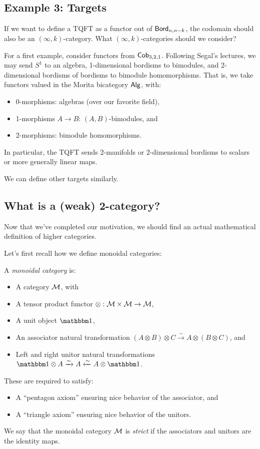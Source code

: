 \subsection{Example 3: Targets}

If we want to define a TQFT as a functor out of $\mathsf{Bord}_{n,n-k}$, the codomain should also be an $(\infty, k)$-category.
What $(\infty, k)$-categories should we consider?

\begin{ex}
	For a first example, consider functors from $\mathsf{Cob}_{3,2,1}$.
	Following Segal's lectures, we may send $S^1$ to an algebra, 1-dimensional bordisms to bimodules, and 2-dimensional bordisms of bordisms to bimodule homomorphisms.
	That is, we take functors valued in the Morita bicategory $\mathsf{Alg}$, with:
	\begin{itemize}
		\item 0-morphisms: algebras (over our favorite field),
		\item 1-morphisms $A \to B$: $(A, B)$-bimodules, and
		\item 2-morphisms: bimodule homomorphisms.
	\end{itemize}
	In particular, the TQFT sends 2-manifolds or 2-dimensional bordisms to scalars or more generally linear maps.
\end{ex}

We can define other targets similarly.

\subsection{What is a (weak) 2-category?}

Now that we've completed our motivation, we should find an actual mathematical definition of higher categories.

Let's first recall how we define monoidal categories:

\begin{dfn}
	A \emph{monoidal category} is:
	\begin{itemize}
		\item A category $\mathcal{M}$, with
		\item A tensor product functor $\otimes: \mathcal{M} \times \mathcal{M} \to \mathcal{M}$,
		\item A unit object $\onebb$,
		\item An associator natural transformation $(A \otimes B) \otimes C \xrightarrow{\sim} A \otimes (B \otimes C)$, and
		\item Left and right unitor natural transformations $\onebb \otimes A \xrightarrow{\sim} A \xleftarrow{\sim} A \otimes \onebb$.
	\end{itemize}
	These are required to satisfy:
	\begin{itemize}
		\item A ``pentagon axiom'' ensuring nice behavior of the associator, and
		\item A ``triangle axiom'' ensuring nice behavior of the unitors.
	\end{itemize}
	We say that the monoidal category $\mathcal{M}$ is \emph{strict} if the associators and unitors are the identity maps.
\end{dfn}

